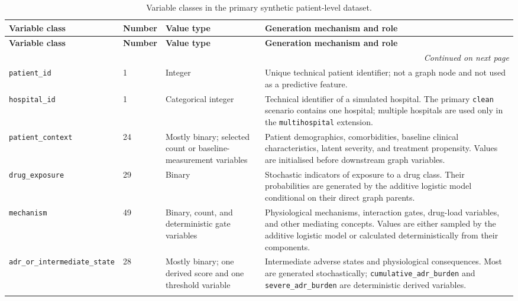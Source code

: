 \begin{longtable}{@{}p{}p{}p{}p{}@{}}
\caption{Variable classes in the primary synthetic patient-level dataset.}
\label{tab:app_variable_classes} \\
\toprule
\textbf{Variable class} & \textbf{Number} & \textbf{Value type} & \textbf{Generation mechanism and role} \\
\midrule
\endfirsthead

\toprule
\textbf{Variable class} & \textbf{Number} & \textbf{Value type} & \textbf{Generation mechanism and role} \\
\midrule
\endhead

\bottomrule
\multicolumn{4}{r}{\emph{Continued on next page}} \\
\endfoot

\bottomrule
\endlastfoot

\texttt{patient\_id} & 1 & Integer & Unique technical patient identifier; not a graph node and not used as a predictive feature. \\
\addlinespace

\texttt{hospital\_id} & 1 & Categorical integer & Technical identifier of a simulated hospital. The primary \texttt{clean} scenario contains one hospital; multiple hospitals are used only in the \texttt{multihospital} extension. \\
\addlinespace

\texttt{patient\_context} & 24 & Mostly binary; selected count or baseline-measurement variables & Patient demographics, comorbidities, baseline clinical characteristics, latent severity, and treatment propensity. Values are initialised before downstream graph variables. \\
\addlinespace

\texttt{drug\_exposure} & 29 & Binary & Stochastic indicators of exposure to a drug class. Their probabilities are generated by the additive logistic model conditional on their direct graph parents. \\
\addlinespace

\texttt{mechanism} & 49 & Binary, count, and deterministic gate variables & Physiological mechanisms, interaction gates, drug-load variables, and other mediating concepts. Values are either sampled by the additive logistic model or calculated deterministically from their components. \\
\addlinespace

\texttt{adr\_or\_intermediate\_state} & 28 & Mostly binary; one derived score and one threshold variable & Intermediate adverse states and physiological consequences. Most are generated stochastically; \texttt{cumulative\_adr\_burden} and \texttt{severe\_adr\_burden} are deterministic derived variables. \\
\addlinespace


\end{longtable}
